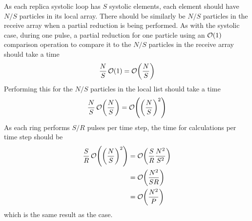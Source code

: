 %
As each replica systolic loop has $S$ systolic elements, each element
should have $N/S$ particles in its local array.
%
There should be similarly be $N/S$ particles in the receive array when
a partial reduction is being performed.
%
As with the systolic case, during one pulse, a partial reduction for one
particle using an $\mathcal{O}{\left({ 1 }\right)}$ comparison operation to compare it to the
$N/S$ particles in the receive array should take a time
\begin{equation}
    \frac{N}{S}\,\mathcal{O}{\left({ 1 }\right)} = \mathcal{O}{\left({ \frac{N}{S} }\right)}
\end{equation}
%
Performing this for the $N/S$ particles in the local list should take a time
\begin{equation}
    \frac{N}{S}\,\mathcal{O}{\left({ \frac{N}{S} }\right)} = \mathcal{O}{\left({ \left( \frac{N}{S} \right)^2 }\right)}
\end{equation}
%
As each ring performs $S/R$ pulses per time step, the time for calculations
per time step should be
\begin{equation}
    \label{eqn:replicated_systolic_pair_operation_calculation_time}
    \begin{split}
        \frac{S}{R}\,\mathcal{O}{\left({ \left( \frac{N}{S} \right)^2 }\right)}
            &= \mathcal{O}{\left({ \frac{S}{R} \frac{N^2}{S^2} }\right)} \\
            &= \mathcal{O}{\left({ \frac{N^2}{SR} }\right)} \\
            &= \mathcal{O}{\left({ \frac{N^2}{P} }\right)}
    \end{split}
\end{equation}
which is the same result as the \systolicloop{} case.


